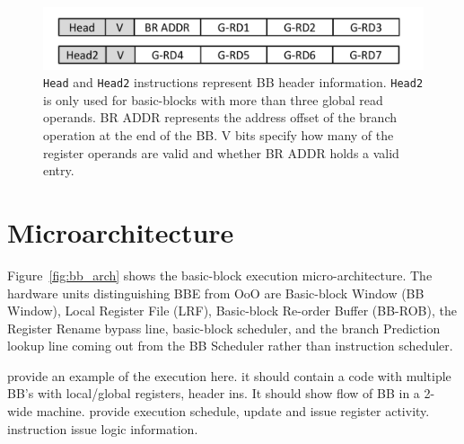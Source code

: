 
\begin{figure}
	\centering
	\includegraphics[width=1.0\columnwidth]{fig/header_ins.pdf} 
    \caption{\texttt{Head} and \texttt{Head2} instructions represent BB
        header information. \texttt{Head2} is only used for basic-blocks with
            more than three global read operands. BR ADDR represents the address
            offset of the branch operation at the end of the BB. V bits specify
            how many of the register operands are valid and whether BR ADDR
            holds a valid entry.}
	\label{fig:header_ins}
\end{figure}

\section{Microarchitecture}


Figure~\ref{fig:bb_arch} shows the basic-block execution micro-architecture. The
hardware units distinguishing BBE from OoO are Basic-block Window (BB Window),
         Local Register File (LRF), Basic-block Re-order Buffer (BB-ROB), the
         Register Rename bypass line, basic-block scheduler, and the branch
         Prediction lookup line coming out from the BB Scheduler rather than
         instruction scheduler. 

provide an example of the execution here.  it should contain a code with
multiple BB's with local/global registers, header ins.  It should show flow of
BB in a 2-wide machine. provide execution schedule, update and issue register
activity. instruction issue logic information.



